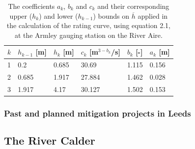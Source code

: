 \documentclass[11pt,a4paper]{article}
\begin{document}
\begin{table}[H]
\centering
\begin{tabular}{l|l|l|l|l|l}
$k$ & $h_{k-1}$ [m] & $h_k$ [m] & $c_k$ [m$^{3-b_k}$/s] & $b_k$ [-] & $a_k$ [m]\\
\hline
1 & 0.2 & 0.685 & 30.69 & 1.115 & 0.156 \\
2 & 0.685 & 1.917 & 27.884 & 1.462 & 0.028 \\
3 & 1.917 & 4.17 & 30.127 & 1.502 & 0.153 \\
\end{tabular}
\caption{The coefficients $a_k$, $b_k$ and $c_k$ and their corresponding upper ($h_k$) and lower ($h_{k-1}$) bounds on $\overline{h}$ \cite{Aire} applied in the calculation of the rating curve, using equation 2.1, at the Armley gauging station on the River Aire.}
\end{table}

\subsubsection{Past and planned mitigation projects in Leeds}
\begin{figure}[H]
\centering
{}
\hfill
{}
\caption{}
\end{figure}

\subsection{The River Calder}
\end{document}
